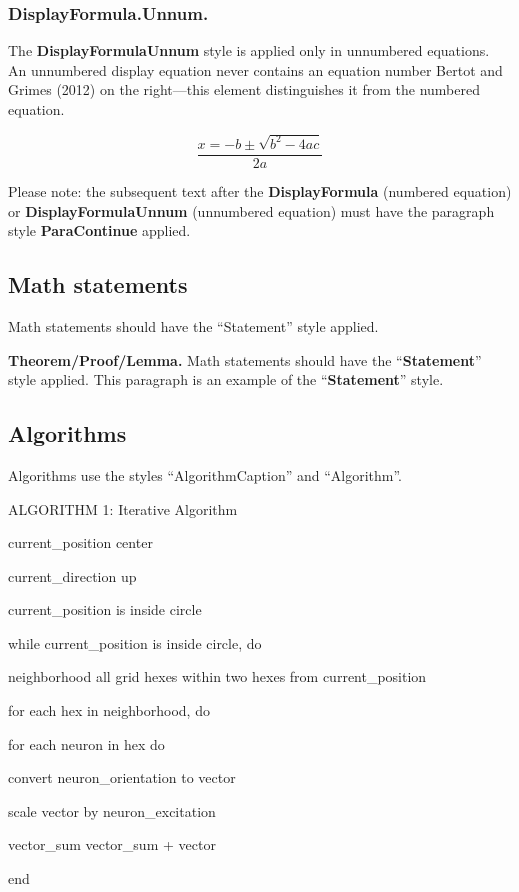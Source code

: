 \documentclass[conference]{IEEEtran}
\begin{document}
\subsubsection{DisplayFormula.Unnum.}

The \textbf{DisplayFormulaUnnum} style is applied only in unnumbered equations. An unnumbered display equation never contains an equation number Bertot and Grimes (2012) on the right—this element distinguishes it from the numbered equation. 

\[
\frac{x=-b\pm\sqrt{{b}^{2} - 4 a c}}{2a}
\]

Please note: the subsequent text after the \textbf{DisplayFormula} (numbered equation) or \textbf{DisplayFormulaUnnum} (unnumbered equation) must have the paragraph style \textbf{ParaContinue} applied.

\subsection{Math statements}

Math statements should have the “Statement” style applied.

\textbf{Theorem/Proof/Lemma.} Math statements should have the “\textbf{Statement}” style applied. This paragraph is an example of the “\textbf{Statement}” style.

\subsection{Algorithms}

Algorithms use the styles “AlgorithmCaption” and “Algorithm”.

ALGORITHM 1: Iterative Algorithm

current\_position  	 center

current\_direction  	 up

current\_position  is inside circle

while current\_position is inside circle, do

	neighborhood all grid hexes within two hexes from current\_position

	for each hex in neighborhood, do 

		for each neuron in hex do

		      convert neuron\_orientation to vector

		      scale vector by neuron\_excitation

	            vector\_sum vector\_sum + vector

             end 
\end{document}
